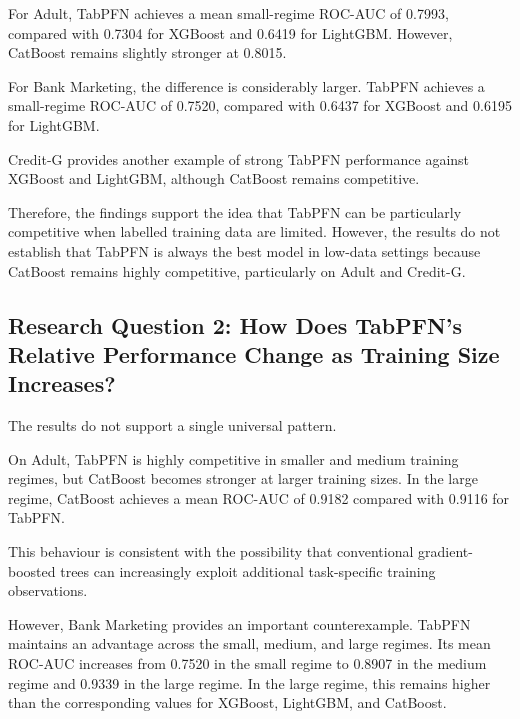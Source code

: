 For Adult, TabPFN achieves a mean small-regime ROC-AUC of 0.7993, compared with 0.7304 for XGBoost and 0.6419 for LightGBM. However, CatBoost remains slightly stronger at 0.8015.



For Bank Marketing, the difference is considerably larger. TabPFN achieves a small-regime ROC-AUC of 0.7520, compared with 0.6437 for XGBoost and 0.6195 for LightGBM.



Credit-G provides another example of strong TabPFN performance against XGBoost and LightGBM, although CatBoost remains competitive.



Therefore, the findings support the idea that TabPFN can be particularly competitive when labelled training data are limited. However, the results do not establish that TabPFN is always the best model in low-data settings because CatBoost remains highly competitive, particularly on Adult and Credit-G.



\subsection{Research Question 2: How Does TabPFN's Relative Performance Change as Training Size Increases?}



The results do not support a single universal pattern.



On Adult, TabPFN is highly competitive in smaller and medium training regimes, but CatBoost becomes stronger at larger training sizes. In the large regime, CatBoost achieves a mean ROC-AUC of 0.9182 compared with 0.9116 for TabPFN.



This behaviour is consistent with the possibility that conventional gradient-boosted trees can increasingly exploit additional task-specific training observations.



However, Bank Marketing provides an important counterexample. TabPFN maintains an advantage across the small, medium, and large regimes. Its mean ROC-AUC increases from 0.7520 in the small regime to 0.8907 in the medium regime and 0.9339 in the large regime. In the large regime, this remains higher than the corresponding values for XGBoost, LightGBM, and CatBoost.



